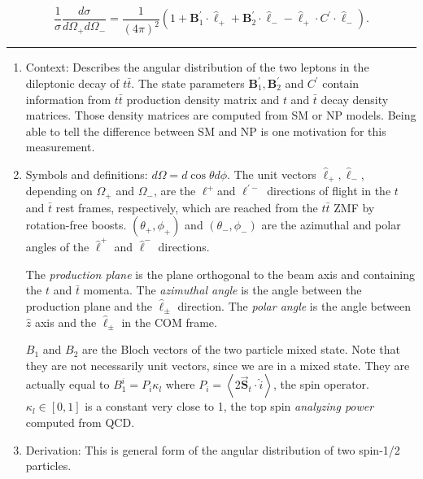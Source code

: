 \begin{tcolorbox}[breakable,colback=cyan!10,title=Angular distribution]
    \[
\frac{1}{\sigma} \frac{d \sigma}{d \Omega_{+} d \Omega_{-}}=\frac{1}{(4 \pi)^2}\left(1+\mathbf{B}_1^{\prime} \cdot \hat{\ell}_{+}+\mathbf{B}_2^{\prime} \cdot \hat{\ell}_{-}-\hat{\ell}_{+} \cdot C^{\prime} \cdot \hat{\ell}_{-}\right)
    .\]
    \rule{\linewidth}{0.1em}
    \begin{enumerate}[leftmargin=!,labelindent=!,itemindent=-15pt]
        \item Context: Describes the angular distribution of the two leptons in the dileptonic decay of $t \bar t$. The state parameters $\mathbf{B}_1^{\prime}, \mathbf{B}_2^{\prime}$ and $C^{\prime}$ contain information from $t\bar t$ production density matrix and $t$ and $\bar t$ decay density matrices. Those density matrices are computed from SM or NP models. Being able to tell the difference between SM and NP is one motivation for this measurement.
        
        \item Symbols and definitions:
        $d \Omega=d \cos \theta d \phi$. 
        The unit vectors $\hat{\ell}_{+}, \hat{\ell}_{-}$, depending on $\Omega_+$ and $\Omega_-$, are the $\ell^{+}$and $\ell^{\prime-}$ directions of flight in the $t$ and $\bar{t}$ rest frames, respectively, which are reached from the $t \bar{t}$ ZMF by rotation-free boosts.
        $(\theta_+, \phi_+)$ and $(\theta_-, \phi_-)$ are the azimuthal and polar angles of the $\hat \ell^+$ and $\hat \ell^-$ directions.

        The \textit{production plane} is the plane orthogonal to the beam axis and containing the $t$ and $\bar{t}$ momenta. The \textit{azimuthal angle} is the angle between the production plane and the $\hat \ell_\pm$ direction. The \textit{polar angle} is the angle between $\hat z$ axis and the $\hat \ell_\pm$ in the COM frame.

        $B_1$ and $B_2$ are the Bloch vectors of the two particle mixed state. Note that they are not necessarily unit vectors, since we are in a mixed state. They are actually equal to $B_1^i=P_i \kappa_l$ where $P_i=\left\langle 2 \vec{\mathbf{S}}_t \cdot \hat{i}\right\rangle$, the spin operator. $\kappa_l \in [0,1]$ is a constant very close to 1, the top spin \textit{analyzing power} computed from QCD.

        \item Derivation: This is general form of the angular distribution of two spin-1/2 particles.


\end{enumerate}
\end{tcolorbox}
